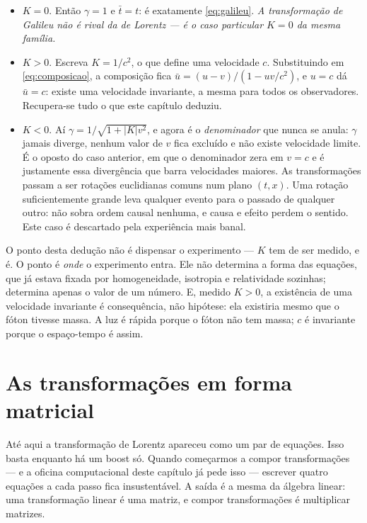 \documentclass[12pt,a4paper,oneside]{book}
\theoremstyle{rgplain}
\theoremstyle{rgremark}
\begin{document}
\begin{itemize}
  \item $K=0$. Então $\gamma=1$ e $\bar t=t$: é exatamente
  \eqref{eq:galileu}. \emph{A transformação de Galileu não é rival da de
  Lorentz --- é o caso particular $K=0$ da mesma família.}
  \item $K>0$. Escreva $K=1/c^2$, o que define uma velocidade $c$. Substituindo
  em \eqref{eq:composicao}, a composição fica $\bar u=(u-v)/(1-uv/c^2)$, e
  $u=c$ dá $\bar u=c$: existe uma velocidade invariante, a mesma para todos os
  observadores. Recupera-se tudo o que este capítulo deduziu.
  \item $K<0$. Aí $\gamma=1/\sqrt{1+|K|v^2}$, e agora é o \emph{denominador}
  que nunca se anula: $\gamma$ jamais diverge, nenhum valor de $v$ fica
  excluído e não existe velocidade limite. É o oposto do caso anterior, em que
  o denominador zera em $v=c$ e é justamente essa divergência que barra
  velocidades maiores. As transformações passam a ser rotações euclidianas
  comuns num plano $(t,x)$. Uma
  rotação suficientemente grande leva qualquer evento para o passado de
  qualquer outro: não sobra ordem causal nenhuma, e causa e efeito perdem o
  sentido. Este caso é descartado pela experiência mais banal.
\end{itemize}

\begin{atencao}
O ponto desta dedução não é dispensar o experimento --- $K$ tem de ser medido,
e é. O ponto é \emph{onde} o experimento entra. Ele não determina a forma das
equações, que já estava fixada por homogeneidade, isotropia e relatividade
sozinhas; determina apenas o valor de um número. E, medido $K>0$, a existência
de uma velocidade invariante é consequência, não hipótese: ela existiria mesmo
que o fóton tivesse massa. A luz é rápida porque o fóton não tem massa; $c$ é
invariante porque o espaço-tempo é assim.
\end{atencao}

\section{As transformações em forma matricial}
\label{sec:matricial}

Até aqui a transformação de Lorentz apareceu como um par de equações. Isso
basta enquanto há um boost só. Quando começarmos a compor transformações ---
e a oficina computacional deste capítulo já pede isso --- escrever quatro
equações a cada passo fica insustentável. A saída é a mesma da álgebra linear:
uma transformação linear é uma matriz, e compor transformações é multiplicar
matrizes.
\end{document}
